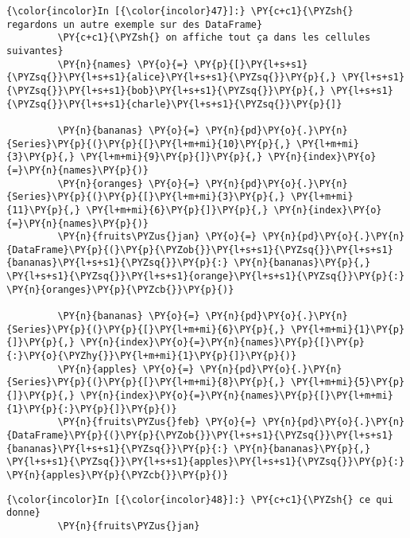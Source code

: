     \begin{Verbatim}[commandchars=\\\{\}]
{\color{incolor}In [{\color{incolor}47}]:} \PY{c+c1}{\PYZsh{} regardons un autre exemple sur des DataFrame}
         \PY{c+c1}{\PYZsh{} on affiche tout ça dans les cellules suivantes}
         \PY{n}{names} \PY{o}{=} \PY{p}{[}\PY{l+s+s1}{\PYZsq{}}\PY{l+s+s1}{alice}\PY{l+s+s1}{\PYZsq{}}\PY{p}{,} \PY{l+s+s1}{\PYZsq{}}\PY{l+s+s1}{bob}\PY{l+s+s1}{\PYZsq{}}\PY{p}{,} \PY{l+s+s1}{\PYZsq{}}\PY{l+s+s1}{charle}\PY{l+s+s1}{\PYZsq{}}\PY{p}{]}
         
         \PY{n}{bananas} \PY{o}{=} \PY{n}{pd}\PY{o}{.}\PY{n}{Series}\PY{p}{(}\PY{p}{[}\PY{l+m+mi}{10}\PY{p}{,} \PY{l+m+mi}{3}\PY{p}{,} \PY{l+m+mi}{9}\PY{p}{]}\PY{p}{,} \PY{n}{index}\PY{o}{=}\PY{n}{names}\PY{p}{)}
         \PY{n}{oranges} \PY{o}{=} \PY{n}{pd}\PY{o}{.}\PY{n}{Series}\PY{p}{(}\PY{p}{[}\PY{l+m+mi}{3}\PY{p}{,} \PY{l+m+mi}{11}\PY{p}{,} \PY{l+m+mi}{6}\PY{p}{]}\PY{p}{,} \PY{n}{index}\PY{o}{=}\PY{n}{names}\PY{p}{)}
         \PY{n}{fruits\PYZus{}jan} \PY{o}{=} \PY{n}{pd}\PY{o}{.}\PY{n}{DataFrame}\PY{p}{(}\PY{p}{\PYZob{}}\PY{l+s+s1}{\PYZsq{}}\PY{l+s+s1}{bananas}\PY{l+s+s1}{\PYZsq{}}\PY{p}{:} \PY{n}{bananas}\PY{p}{,} \PY{l+s+s1}{\PYZsq{}}\PY{l+s+s1}{orange}\PY{l+s+s1}{\PYZsq{}}\PY{p}{:} \PY{n}{oranges}\PY{p}{\PYZcb{}}\PY{p}{)}
         
         \PY{n}{bananas} \PY{o}{=} \PY{n}{pd}\PY{o}{.}\PY{n}{Series}\PY{p}{(}\PY{p}{[}\PY{l+m+mi}{6}\PY{p}{,} \PY{l+m+mi}{1}\PY{p}{]}\PY{p}{,} \PY{n}{index}\PY{o}{=}\PY{n}{names}\PY{p}{[}\PY{p}{:}\PY{o}{\PYZhy{}}\PY{l+m+mi}{1}\PY{p}{]}\PY{p}{)}
         \PY{n}{apples} \PY{o}{=} \PY{n}{pd}\PY{o}{.}\PY{n}{Series}\PY{p}{(}\PY{p}{[}\PY{l+m+mi}{8}\PY{p}{,} \PY{l+m+mi}{5}\PY{p}{]}\PY{p}{,} \PY{n}{index}\PY{o}{=}\PY{n}{names}\PY{p}{[}\PY{l+m+mi}{1}\PY{p}{:}\PY{p}{]}\PY{p}{)}
         \PY{n}{fruits\PYZus{}feb} \PY{o}{=} \PY{n}{pd}\PY{o}{.}\PY{n}{DataFrame}\PY{p}{(}\PY{p}{\PYZob{}}\PY{l+s+s1}{\PYZsq{}}\PY{l+s+s1}{bananas}\PY{l+s+s1}{\PYZsq{}}\PY{p}{:} \PY{n}{bananas}\PY{p}{,} \PY{l+s+s1}{\PYZsq{}}\PY{l+s+s1}{apples}\PY{l+s+s1}{\PYZsq{}}\PY{p}{:} \PY{n}{apples}\PY{p}{\PYZcb{}}\PY{p}{)}
\end{Verbatim}


    \begin{Verbatim}[commandchars=\\\{\}]
{\color{incolor}In [{\color{incolor}48}]:} \PY{c+c1}{\PYZsh{} ce qui donne}
         \PY{n}{fruits\PYZus{}jan}
\end{Verbatim}


